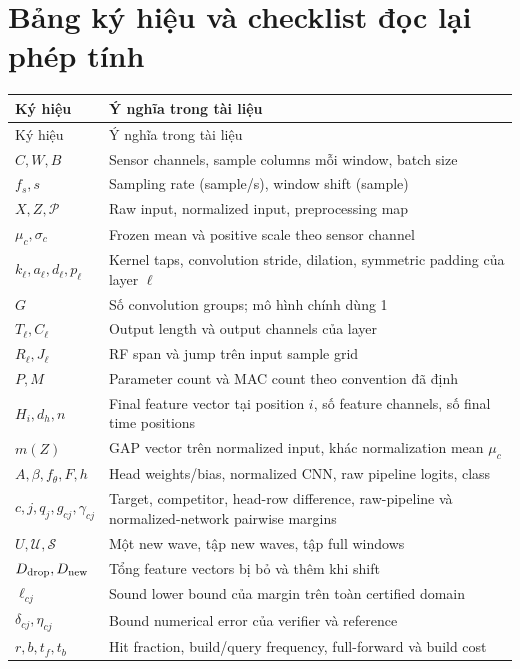 \documentclass[11pt,a4paper]{article}
\newcommand{\Sset}{\mathcal S}
\newcommand{\Uset}{\mathcal U}
\theoremstyle{definition}
\begin{document}
\section{Bảng ký hiệu và checklist đọc lại phép tính}
\begin{longtable}{@{}P{2.7cm}P{11.4cm}@{}}
\toprule Ký hiệu & Ý nghĩa trong tài liệu\\\midrule
\endfirsthead
\toprule Ký hiệu & Ý nghĩa trong tài liệu\\\midrule
\endhead
$C,W,B$ & Sensor channels, sample columns mỗi window, batch size\\
$f_s,s$ & Sampling rate (sample/s), window shift (sample)\\
$X,Z,\mathcal P$ & Raw input, normalized input, preprocessing map\\
$\mu_c,\sigma_c$ & Frozen mean và positive scale theo sensor channel\\
$k_\ell,a_\ell,d_\ell,p_\ell$ & Kernel taps, convolution stride,
dilation, symmetric padding của layer $\ell$\\
$G$ & Số convolution groups; mô hình chính dùng 1\\
$T_\ell,C_\ell$ & Output length và output channels của layer\\
$R_\ell,J_\ell$ & RF span và jump trên input sample grid\\
$P,M$ & Parameter count và MAC count theo convention đã định\\
$H_i,d_h,n$ & Final feature vector tại position $i$, số feature channels,
số final time positions\\
$m(Z)$ & GAP vector trên normalized input, khác normalization mean $\mu_c$\\
$A,\beta,f_\theta,F,h$ & Head weights/bias, normalized CNN, raw pipeline logits, class\\
$c,j,q_j,g_{cj},\gamma_{cj}$ & Target, competitor, head-row difference,
raw-pipeline và normalized-network pairwise margins\\
$U,\Uset,\Sset$ & Một new wave, tập new waves, tập full windows\\
$D_{\rm drop},D_{\rm new}$ & Tổng feature vectors bị bỏ và thêm khi shift\\
$\ell_{cj}$ & Sound lower bound của margin trên toàn certified domain\\
$\delta_{cj},\eta_{cj}$ & Bound numerical error của verifier và reference\\
$r,b,t_f,t_b$ & Hit fraction, build/query frequency, full-forward và build cost\\\bottomrule
\end{longtable}
\end{document}
